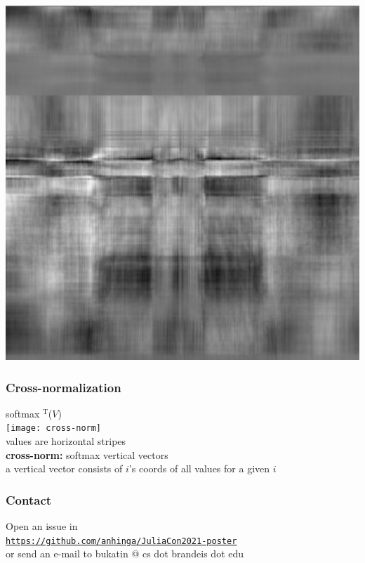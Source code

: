 \documentclass{beamer}
\newcommand{\msmagenta}[1]{{\color{mymagenta} #1}}
\begin{document}
\begin{frame}

\includegraphics[scale=0.5]{asymmetric}

\end{frame}

\begin{frame}

\frametitle{Cross-normalization}

{\LARGE softmax\msmagenta{$^\text{T}$}($V$)}\\[2ex]

\texttt{[image: cross-norm]}\\[2ex]

values are horizontal stripes\\[2ex]

{\bf cross-norm:} softmax vertical vectors\\[2ex]

a vertical vector consists of $i$'s coords of all values for a given $i$



\end{frame}

\begin{frame}

\frametitle{Contact}

Open an issue in\\[2ex]

\href{https://github.com/anhinga/JuliaCon2021-poster}{\tt https://github.com/anhinga/JuliaCon2021-poster}\\[2ex]


or send an e-mail to bukatin @ cs dot brandeis dot edu



\end{frame}
\end{document}
